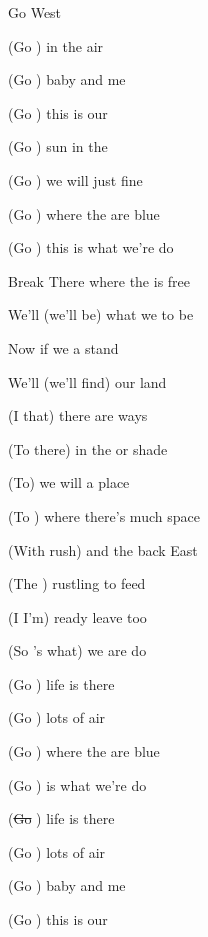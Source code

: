 \begin{SBSong}{Go West}
\begin{SBChorus}
    (Go ) in the  air

    (Go ) baby  and me

    (Go ) this is our 

    (Go ) sun in the 

    (Go ) we will  just fine

    (Go ) where the  are blue

    (Go ) this is what we're  do
  \end{SBChorus}

  \WBPageBrk

  \begin{SBBracket}{Break}
     There where the  is free

    We'll  (we'll be)  what we  to be

     Now if we  a stand

    We'll  (we'll find) our  land
  \end{SBBracket}

  \begin{SBVerse}
    (I  that) there are  ways

    (To  there) in the  or shade

    (To) we will  a place

    (To ) where there's  much space

    (With rush) and the  back East

    (The ) rustling  to feed

    (I  I'm) ready  leave too

    (So 's what) we are  do
  \end{SBVerse}

  \begin{SBChorus}
    (Go ) life is  there

    (Go ) lots of  air

    (Go ) where the  are blue

    (Go ) is what we're  do

    (\sout{Go }) life is  there

    (Go ) lots of  air

    (Go ) baby  and me

    (Go ) this is our 
  \end{SBChorus}


\end{SBSong}
